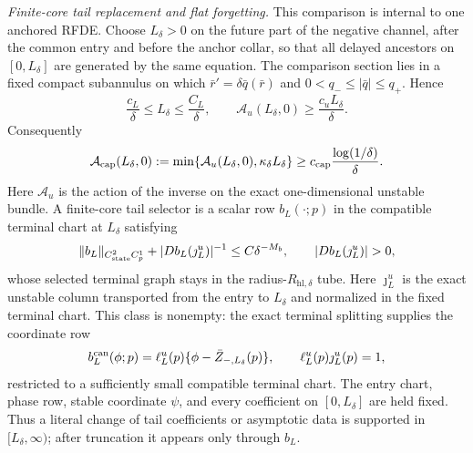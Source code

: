 \begin{lemma}
\smallskip
\noindent
\emph{Finite-core tail replacement and flat forgetting.}
This comparison is internal to one anchored RFDE.  Choose
\(L_\delta>0\) on the future part of the negative channel, after the common
entry and before the anchor collar, so that all delayed ancestors on
\([0,L_\delta]\) are generated by the same equation.  The comparison
section lies in a fixed compact subannulus on which
\(\bar r'=\delta\bar q(\bar r)\) and
\(0<q_-\le|\bar q|\le q_+\).  Hence
\begin{equation}
 \frac{c_L}{\delta}\le L_\delta\le\frac{C_L}{\delta},
 \qquad
 \mathcal A_u(L_\delta,0)\ge\frac{c_uL_\delta}{\delta}.
                                                        \label{eq:anchor-tail-buffer-time}
\end{equation}
Consequently
\begin{equation}
 \mathcal A_{\rm cap}(L_\delta,0)
 :=\min\{\mathcal A_u(L_\delta,0),\kappa_\delta L_\delta\}
 \ge c_{\rm cap}\frac{\log(1/\delta)}{\delta}.       \label{eq:anchor-tail-capped-action}
\end{equation}
Here \(\mathcal A_u\) is the action of the inverse on the exact
one-dimensional unstable bundle.  A finite-core tail selector is a scalar
row \(b_L(\cdot;p)\) in the compatible terminal chart at \(L_\delta\)
satisfying
\begin{equation}
 \|b_L\|_{C^2_{\rm state}C^1_p}
 +|D b_L(\jmath_L^u)|^{-1}
 \le C\delta^{-M_b},\qquad
 |D b_L(\jmath_L^u)|>0,                              \label{eq:anchor-admissible-tail-selector}
\end{equation}
whose selected terminal graph stays in the
radius-\(R_{\mathrm{hl},\delta}\) tube.
Here \(\jmath_L^u\) is the exact unstable column transported from the
entry to \(L_\delta\) and normalized in the fixed terminal chart.
This class is nonempty: the exact terminal splitting supplies the
coordinate row
\[
 b_L^{\rm can}(\phi;p)
 =\ell_L^u(p)\{\phi-\bar Z_{-,L_\delta}(p)\},
 \qquad \ell_L^u(p)\jmath_L^u(p)=1,
\]
restricted to a sufficiently small compatible terminal chart.
The entry chart, phase row, stable coordinate \(\psi\), and every
coefficient on \([0,L_\delta]\) are held fixed.  Thus a literal change of
tail coefficients or asymptotic data is supported in
\([L_\delta,\infty)\); after truncation it appears only through \(b_L\).


\end{lemma}
